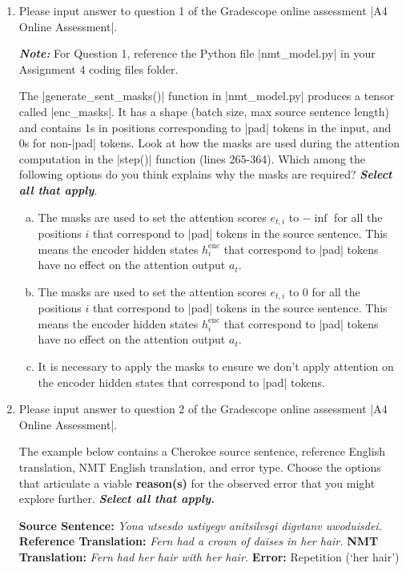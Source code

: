\begin{enumerate}[1.]
\item {}
Please input answer to question 1 of the Gradescope online assessment |A4 Online Assessment|.

{\em {\bf Note:}} For Question 1, reference the Python file |nmt_model.py| in your Assignment 4 coding files folder. 

The |generate_sent_masks()| function in |nmt_model.py| produces a tensor called |enc_masks|. It has a shape (batch size, max source sentence length) and contains 1s in positions corresponding to |pad| tokens in the input, and 0s for non-|pad| tokens. Look at how the masks are used during the attention computation in the |step()| function (lines 265-364). Which among the following options do you think explains why the masks are required? {\em{\bf Select all that apply}}.

\begin{enumerate}[(a)]
\item The masks are used to set the attention scores $e_{t,i}$ to $-\inf$ for all the positions $i$ that correspond to |pad| tokens in the source sentence. This means the encoder hidden states $h_i^\text{enc}$ that correspond to |pad| tokens have no effect on the attention output $a_t$.
\item The masks are used to set the attention scores $e_{t,i}$ to 0 for all the positions $i$ that correspond to |pad| tokens in the source sentence. This means the encoder hidden states $h_i^\text{enc}$ that correspond to |pad| tokens have no effect on the attention output $a_t$.
\item It is necessary to apply the masks to ensure we don’t apply attention on the encoder hidden states that correspond to |pad| tokens. 
\end{enumerate}


\item {} Please input answer to question 2 of the Gradescope online assessment |A4 Online Assessment|.

The example below contains a Cherokee source sentence, reference English translation, NMT English translation, and error type. Choose the options that articulate a viable {\bf reason(s)} for the observed error that you might explore further. {\bf {\em Select all that apply.}}

{\bf Source Sentence:} {\em Yona utsesdo ustiyegv anitsilvsgi digvtanv uwoduisdei.}
\newline
{\bf Reference Translation:} {\em Fern had a crown of daises in her hair.}
\newline
{\bf NMT Translation:} {\em Fern had her hair with her hair.}
\newline
{\bf Error:} Repetition (`her hair')
\newline


\end{enumerate}
